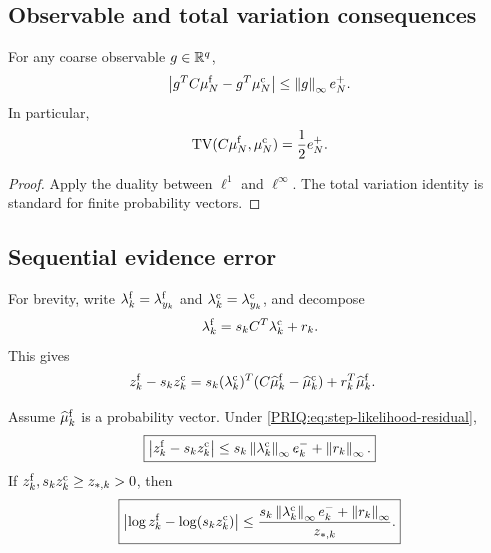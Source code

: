 \subsection{Observable and total variation consequences}

\begin{PRIQcorollary}\label{PRIQ:cor:observable-error}
For any coarse observable $g\in\mathbb R^q$,
\[
  \left\lvert g^TC\mu_N^{\mathrm f}-g^T\mu_N^{\mathrm c}\right\rvert
  \leq
  \left\lVert g\right\rVert_{\infty}e_N^+.
\]
In particular,
\[
  \operatorname{TV}(C\mu_N^{\mathrm f},\mu_N^{\mathrm c})
  =\frac12e_N^+.
\]
\end{PRIQcorollary}

\begin{proof}
Apply the duality between $\ell^1$ and $\ell^\infty$.  The total variation identity is standard for finite probability vectors.
\end{proof}

\subsection{Sequential evidence error}
For brevity, write $\lambda_k^{\mathrm f}=\lambda_{y_k}^{\mathrm f}$ and $\lambda_k^{\mathrm c}=\lambda_{y_k}^{\mathrm c}$, and decompose
\begin{equation}\label{PRIQ:eq:step-likelihood-residual}
  \lambda_k^{\mathrm f}
  =s_kC^T\lambda_k^{\mathrm c}+r_k.
\end{equation}
This gives
\begin{align}
  z_k^{\mathrm f}-s_kz_k^{\mathrm c}
  &=
  s_k(\lambda_k^{\mathrm c})^T
  (C\widehat\mu_k^{\mathrm f}-\widehat\mu_k^{\mathrm c})
  +r_k^T\widehat\mu_k^{\mathrm f}.
  \label{PRIQ:eq:evidence-error-identity}
\end{align}

\begin{PRIQproposition}\label{PRIQ:prop:evidence-error}
Assume $\widehat\mu_k^{\mathrm f}$ is a probability vector.  Under \eqref{PRIQ:eq:step-likelihood-residual},
\begin{equation}\label{PRIQ:eq:evidence-error-bound}
  \boxed{
  \left\lvert z_k^{\mathrm f}-s_kz_k^{\mathrm c}\right\rvert
  \leq
  s_k\left\lVert \lambda_k^{\mathrm c}\right\rVert_{\infty}e_k^-
  +\left\lVert r_k\right\rVert_{\infty}.}
\end{equation}
If $z_k^{\mathrm f},s_kz_k^{\mathrm c}\geq z_{*,k}>0$, then
\begin{equation}\label{PRIQ:eq:log-evidence-step}
  \boxed{
  \left\lvert 
  \log z_k^{\mathrm f}
  -\log(s_kz_k^{\mathrm c})\right\rvert
  \leq
  \frac{
  s_k\left\lVert \lambda_k^{\mathrm c}\right\rVert_{\infty}e_k^-
  +\left\lVert r_k\right\rVert_{\infty}
  }{z_{*,k}}.}
\end{equation}
\end{PRIQproposition}


